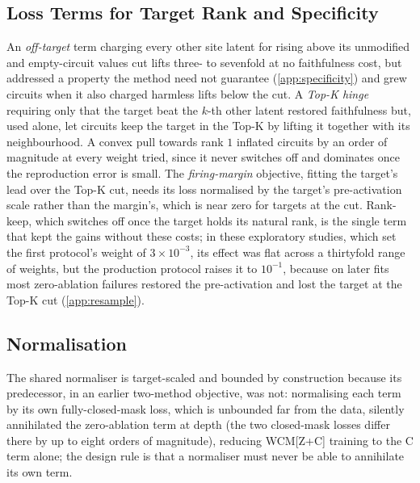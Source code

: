 \documentclass[10pt]{article}
\begin{document}
\subsection{Loss Terms for Target Rank and Specificity}
\label{app:rank-designs}
An \emph{off-target} term charging every other site latent for rising above its unmodified and empty-circuit values cut lifts three- to sevenfold at no faithfulness cost, but addressed a property the method need not guarantee (\cref{app:specificity}) and grew circuits when it also charged harmless lifts below the cut.
A \emph{Top-K hinge} requiring only that the target beat the $k$-th other latent restored faithfulness but, used alone, let circuits keep the target in the Top-K by lifting it together with its neighbourhood.
A convex pull towards rank $1$ inflated circuits by an order of magnitude at every weight tried, since it never switches off and dominates once the reproduction error is small.
The \emph{firing-margin} objective, fitting the target's lead over the Top-K cut, needs its loss normalised by the target's pre-activation scale rather than the margin's, which is near zero for targets at the cut.
Rank-keep, which switches off once the target holds its natural rank, is the single term that kept the gains without these costs; in these exploratory studies, which set the first protocol's weight of $3 \times 10^{-3}$, its effect was flat across a thirtyfold range of weights, but the production protocol raises it to $10^{-1}$, because on later fits most zero-ablation failures restored the pre-activation and lost the target at the Top-K cut (\cref{app:resample}).

\subsection{Normalisation}
The shared normaliser is target-scaled and bounded by construction because its predecessor, in an earlier two-method objective, was not: normalising each term by its own fully-closed-mask loss, which is unbounded far from the data, silently annihilated the zero-ablation term at depth (the two closed-mask losses differ there by up to eight orders of magnitude), reducing WCM[Z+C] training to the C term alone; the design rule is that a normaliser must never be able to annihilate its own term.
\end{document}
